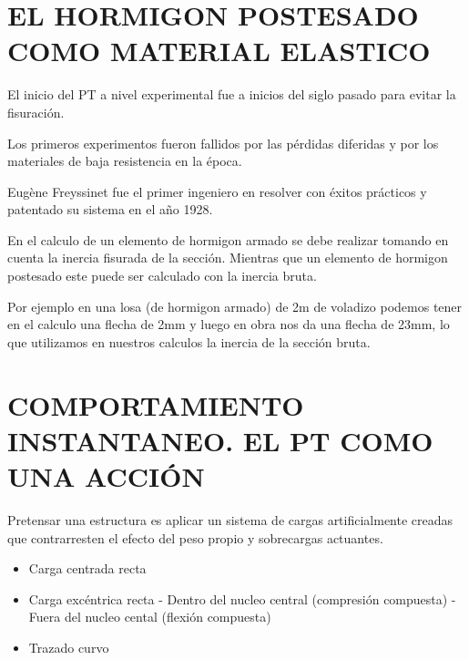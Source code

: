 
\color{white}
\pagecolor{black_background}

\tableofcontents
\newpage


\section{EL HORMIGON POSTESADO COMO MATERIAL ELASTICO}

El inicio del PT a nivel experimental fue a inicios del siglo
pasado para evitar la fisuración. \newline

Los primeros experimentos fueron fallidos por las pérdidas diferidas
y por los materiales de baja resistencia en la época. \newline

Eugène Freyssinet fue el primer ingeniero en resolver con éxitos prácticos
y patentado su sistema en el año 1928. \newline

En el calculo de un elemento de hormigon armado se debe realizar
tomando en cuenta la inercia fisurada de la sección. Mientras que un
elemento de hormigon postesado este puede ser calculado con la inercia
bruta. \newline

Por ejemplo en una losa (de hormigon armado) de 2m de voladizo podemos tener en el calculo
una flecha de 2mm y luego en obra nos da una flecha de 23mm, lo que utilizamos en
nuestros calculos la inercia de la sección bruta.


\section{COMPORTAMIENTO INSTANTANEO. EL PT COMO UNA ACCIÓN}

Pretensar una estructura es aplicar un sistema de cargas artificialmente
creadas que contrarresten el efecto del peso propio y sobrecargas
actuantes.

\begin{itemize}
    \item Carga centrada recta
    \item Carga excéntrica recta
        \subitem - Dentro del nucleo central (compresión compuesta)
        \subitem - Fuera del nucleo cental (flexión compuesta)
    \item Trazado curvo
\end{itemize}

